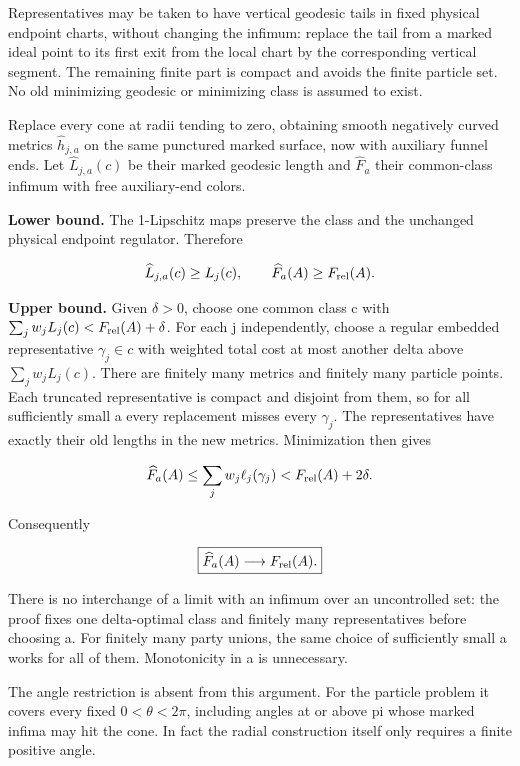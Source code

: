 \documentclass[11pt]{article}
\begin{document}
Representatives may be taken to have vertical geodesic tails in fixed
physical endpoint charts, without changing the infimum: replace the tail
from a marked ideal point to its first exit from the local chart by the
corresponding vertical segment. The remaining finite part is compact and
avoids the finite particle set. No old minimizing geodesic or minimizing
class is assumed to exist.

Replace every cone at radii tending to zero, obtaining smooth negatively
curved metrics \(\widehat h_{j,a}\) on the same punctured marked
surface, now with auxiliary funnel ends. Let \(\widehat L_{j,a}(c)\) be
their marked geodesic length and \(\widehat F_a\) their common-class
infimum with free auxiliary-end colors.

\textbf{Lower bound.} The 1-Lipschitz maps preserve the class and the
unchanged physical endpoint regulator. Therefore

\[
\widehat L_{j,a}(c)\ge L_j(c),\qquad
\widehat F_a(A)\ge F_{\rm rel}(A).
\]

\textbf{Upper bound.} Given \(\delta>0\), choose one common class c with
\(\sum_jw_jL_j(c)<F_{\rm rel}(A)+\delta\). For each j independently,
choose a regular embedded representative \(\gamma_j\in c\) with weighted
total cost at most another delta above \(\sum_jw_jL_j(c)\). There are
finitely many metrics and finitely many particle points. Each truncated
representative is compact and disjoint from them, so for all
sufficiently small a every replacement misses every \(\gamma_j\). The
representatives have exactly their old lengths in the new metrics.
Minimization then gives

\[
\widehat F_a(A)\le\sum_jw_j\ell_j(\gamma_j)
<F_{\rm rel}(A)+2\delta.
\]

Consequently

\[
\boxed{\widehat F_a(A)\longrightarrow F_{\rm rel}(A).}
\]

There is no interchange of a limit with an infimum over an uncontrolled
set: the proof fixes one delta-optimal class and finitely many
representatives before choosing a. For finitely many party unions, the
same choice of sufficiently small a works for all of them. Monotonicity
in a is unnecessary.

The angle restriction is absent from this argument. For the particle
problem it covers every fixed \(0<\theta<2\pi\), including angles at or
above pi whose marked infima may hit the cone. In fact the radial
construction itself only requires a finite positive angle.
\end{document}
